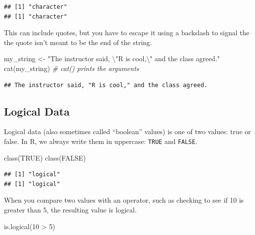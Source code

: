 \documentclass[
  oneside]{book}
\newenvironment{Shaded}{\begin{snugshade}}{\end{snugshade}}
\newcommand{\CommentTok}[1]{\textcolor[rgb]{0.56,0.35,0.01}{\textit{#1}}}
\newcommand{\ConstantTok}[1]{\textcolor[rgb]{0.00,0.00,0.00}{#1}}
\newcommand{\DecValTok}[1]{\textcolor[rgb]{0.00,0.00,0.81}{#1}}
\newcommand{\FunctionTok}[1]{\textcolor[rgb]{0.00,0.00,0.00}{#1}}
\newcommand{\NormalTok}[1]{#1}
\newcommand{\OtherTok}[1]{\textcolor[rgb]{0.56,0.35,0.01}{#1}}
\newcommand{\SpecialCharTok}[1]{\textcolor[rgb]{0.00,0.00,0.00}{#1}}
\newcommand{\StringTok}[1]{\textcolor[rgb]{0.31,0.60,0.02}{#1}}
\begin{document}
\begin{verbatim}
## [1] "character"
## [1] "character"
\end{verbatim}

This can include quotes, but you have to escape it using a backslash to signal the the quote isn't meant to be the end of the string.

\begin{Shaded}
\begin{Highlighting}[]
\NormalTok{my\_string }\OtherTok{\textless{}{-}} \StringTok{"The instructor said, }\SpecialCharTok{\textbackslash{}"}\StringTok{R is cool,}\SpecialCharTok{\textbackslash{}"}\StringTok{ and the class agreed."}
\FunctionTok{cat}\NormalTok{(my\_string) }\CommentTok{\# cat() prints the arguments}
\end{Highlighting}
\end{Shaded}

\begin{verbatim}
## The instructor said, "R is cool," and the class agreed.
\end{verbatim}

\hypertarget{logical-data}{%
\subsection{Logical Data}\label{logical-data}}

Logical data (also sometimes called ``boolean'' values) is one of two values: true or false. In R, we always write them in uppercase: \texttt{TRUE} and \texttt{FALSE}.

\begin{Shaded}
\begin{Highlighting}[]
\FunctionTok{class}\NormalTok{(}\ConstantTok{TRUE}\NormalTok{)}
\FunctionTok{class}\NormalTok{(}\ConstantTok{FALSE}\NormalTok{)}
\end{Highlighting}
\end{Shaded}

\begin{verbatim}
## [1] "logical"
## [1] "logical"
\end{verbatim}

When you compare two values with an operator, such as checking to see if 10 is greater than 5, the resulting value is logical.

\begin{Shaded}
\begin{Highlighting}[]
\FunctionTok{is.logical}\NormalTok{(}\DecValTok{10} \SpecialCharTok{\textgreater{}} \DecValTok{5}\NormalTok{)}
\end{Highlighting}
\end{Shaded}
\end{document}
